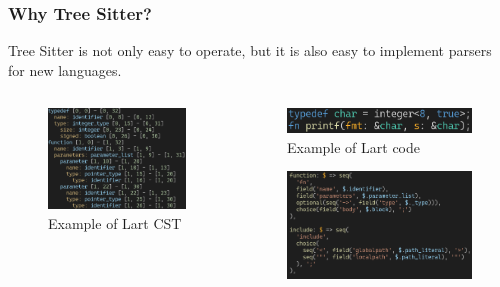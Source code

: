 \documentclass[dvipsnames, 10pt]{beamer}
\begin{document}
\begin{frame}
  \frametitle{Why Tree Sitter?}
  Tree Sitter is not only easy to operate, but it is also easy to implement parsers for new languages.

  \begin{columns}
    \begin{column}{0.5\textwidth}
      \begin{figure}
        \begin{center}
          \includegraphics[width=1.0\textwidth]{figures/solution/ts-lart-cst.png}
          \caption{Example of Lart CST}
        \end{center}
      \end{figure}
    \end{column}
    \begin{column}{0.5\textwidth}
      \begin{figure}
        \begin{center}
          \includegraphics[width=1.0\textwidth]{figures/solution/ts-lart-code.png}
          \caption{Example of Lart code}
        \end{center}
      \end{figure}
      \begin{figure}
        \begin{center}
          \includegraphics[width=1.0\textwidth]{figures/solution/ts-lart-grammar.png}

\end{center}
\end{figure}
\end{column}
\end{columns}
\end{frame}
\end{document}
